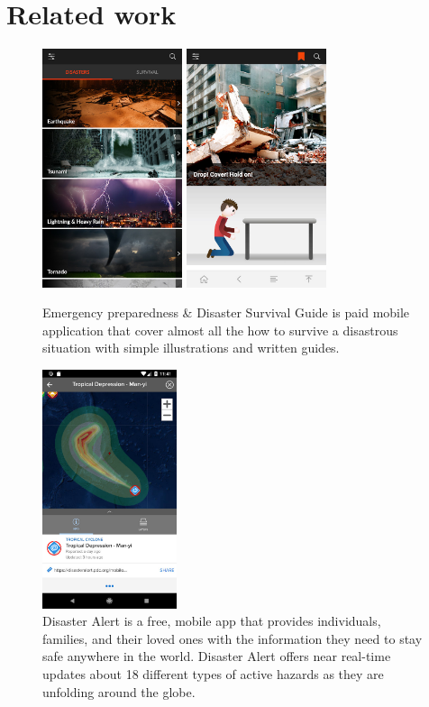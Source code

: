 \documentclass[10pt,a4paper]{article}
\begin{document}
\section{Related work}
\begin{figure}[ht!]
    \centering
    \includegraphics[height=7cm]{appImages/EPD1.jpg}
    \qquad
    \includegraphics[height=7cm]{appImages/EPD2.jpg}
    \caption{Emergency preparedness \& Disaster Survival Guide is paid mobile application that cover almost all the how to survive a disastrous situation with simple  illustrations and written guides.}%
    \label{fig:example}%
\end{figure}

   
\begin{figure}[ht!]
    \centering
    \includegraphics[height=7cm]{appImages/DA1.jpg}
    \caption{Disaster Alert is a free, mobile app that provides individuals, families, and their loved ones with the information they need to stay safe anywhere in the world. Disaster Alert offers near real-time updates about 18 different types of active hazards as they are unfolding around the globe.}
    \label{fig:my_label}
\end{figure}
\end{document}

